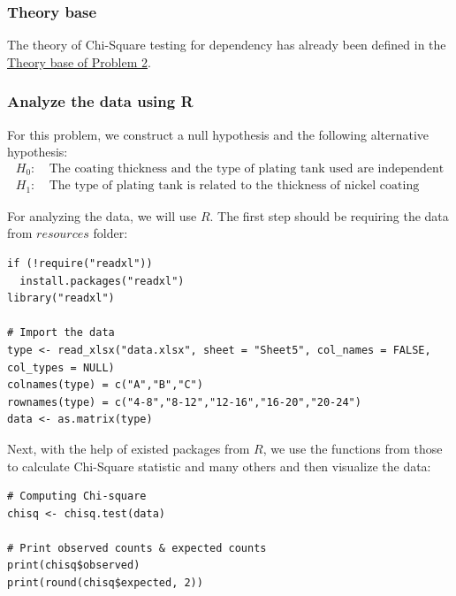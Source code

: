 \documentclass[a4paper]{article}
\numberwithin{equation}{section}
\begin{document}
\subsubsection{Theory base}
The theory of Chi-Square testing for dependency has already been defined in the \hyperref[p2:theory]{\underline{Theory base of Problem 2}}.

\subsubsection{Analyze the data using R}
For this problem, we construct a null hypothesis and the following alternative hypothesis:
\begin{align*}
  H_0: & \ \text{The coating thickness and the type of plating tank used are independent} \\
  H_1: & \ \text{The type of plating tank is related to the thickness of nickel coating}
\end{align*}

For analyzing the data, we will use \(R\). The first step should be requiring the data from \(resources\) folder:
\begin{mdframed}[leftline=false,rightline=false,backgroundcolor=magenta!10,nobreak=true]
  \begin{verbatim}
if (!require("readxl"))
  install.packages("readxl")
library("readxl")

# Import the data
type <- read_xlsx("data.xlsx", sheet = "Sheet5", col_names = FALSE, col_types = NULL)
colnames(type) = c("A","B","C")
rownames(type) = c("4-8","8-12","12-16","16-20","20-24")
data <- as.matrix(type)
  \end{verbatim}
\end{mdframed}

Next, with the help of existed packages from \(R\), we use the functions from those to calculate Chi-Square statistic and many others and then visualize the data:
\begin{mdframed}[leftline=false,rightline=false,backgroundcolor=magenta!10,nobreak=true]
  \begin{verbatim}
# Computing Chi-square
chisq <- chisq.test(data)

# Print observed counts & expected counts
print(chisq$observed)
print(round(chisq$expected, 2))
  \end{verbatim}
\end{mdframed}
\end{document}
